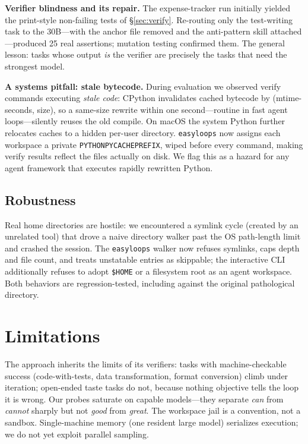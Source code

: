 \documentclass[11pt]{article}
\newcommand{\el}{\texttt{easyloops}}
\newcommand{\code}[1]{\texttt{#1}}
\begin{document}
\textbf{Verifier blindness and its repair.} The expense-tracker run initially yielded the
print-style non-failing tests of \S\ref{sec:verify}. Re-routing only the test-writing task to
the 30B---with the anchor file removed and the anti-pattern skill attached---produced 25 real
assertions; mutation testing confirmed them. The general lesson: tasks whose output \emph{is}
the verifier are precisely the tasks that need the strongest model.

\textbf{A systems pitfall: stale bytecode.} During evaluation we observed verify commands
executing \emph{stale code}: CPython invalidates cached bytecode by (mtime-seconds, size), so a
same-size rewrite within one second---routine in fast agent loops---silently reuses the old
compile. On macOS the system Python further relocates caches to a hidden per-user directory.
\el{} now assigns each workspace a private \code{PYTHONPYCACHEPREFIX}, wiped before every
command, making verify results reflect the files actually on disk. We flag this as a hazard for
any agent framework that executes rapidly rewritten Python.

\subsection{Robustness}

Real home directories are hostile: we encountered a symlink cycle (created by an unrelated
tool) that drove a naive directory walker past the OS path-length limit and crashed the
session. The \el{} walker now refuses symlinks, caps depth and file count, and treats
unstatable entries as skippable; the interactive CLI additionally refuses to adopt \code{\$HOME}
or a filesystem root as an agent workspace. Both behaviors are regression-tested, including
against the original pathological directory.

\section{Limitations}

The approach inherits the limits of its verifiers: tasks with machine-checkable success
(code-with-tests, data transformation, format conversion) climb under iteration; open-ended
taste tasks do not, because nothing objective tells the loop it is wrong. Our probes saturate
on capable models---they separate \emph{can} from \emph{cannot} sharply but not \emph{good}
from \emph{great}. The workspace jail is a convention, not a sandbox. Single-machine memory
(one resident large model) serializes execution; we do not yet exploit parallel sampling.
\end{document}
